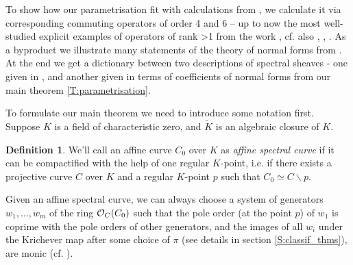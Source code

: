 \documentclass[11pt]{article}
\theoremstyle{definition}
\newtheorem{Def}{Definition}[section]
\theoremstyle{plain}
\numberwithin{equation}{section}
\newcommand{\co}{{{\cal O}}}
\begin{document}
To show how our parametrisation fit with calculations from \cite{BZ}, we calculate it via corresponding commuting operators of order 4 and 6 -- up to now the most well-studied explicit examples of operators of rank >1 from the work \cite{KN}, cf. also \cite{Grun}, \cite{G}, \cite{Mokh}. As a byproduct we illustrate many statements of the theory of normal forms from \cite[\S 2]{GZ24}. At the end we get a dictionary between two descriptions of spectral sheaves - one given in \cite{BZ}, and another given in terms of coefficients of normal forms from our main theorem \ref{T:parametrisation}.

To formulate our main theorem we need to introduce some notation first. Suppose $K$ is a field of characteristic zero, and $\tilde{K}$ is an algebraic closure of $K$.

\begin{Def}
\label{D:affine_spec_curve}
We'll call an affine curve $C_0$ over $K$ as {\it affine spectral curve} if it can be compactified with the help of one regular $K$-point, i.e. if there exists a projective curve $C$ over $K$ and a regular $K$-point $p$ such that $C_0\simeq C\backslash p$.
\end{Def}

Given an affine spectral curve, we can always choose a system of generators $w_1, \ldots , w_m$ of the ring $\co_{C}(C_0)$ such that the pole order (at the point $p$) of $w_1$ is coprime with the pole orders of other generators, and the images of all $w_i$ under the Krichever map after some choice of $\pi$ (see details in section \ref{S:classif_thms}),  are monic (cf. \cite[Rem 3.7]{GZ24}). 
\end{document}
